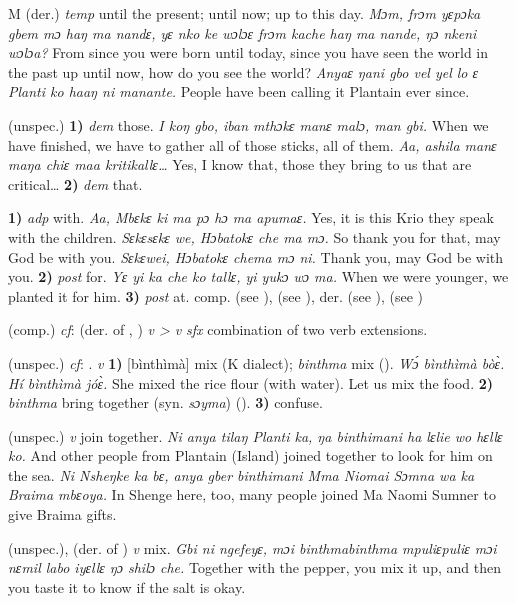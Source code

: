 \begin{letter}{M}
 (der.) \textit{temp} until the present; until now; up to this day. \textit{Mɔm, frɔm yɛpɔka gbem mɔ haŋ ma nandɛ, yɛ nko ke wɔlɔɛ frɔm kache haŋ ma nande, ŋɔ nkeni wɔlɔa?} From since you were born until today, since you have seen the world in the past up until now, how do you see the world? \textit{Anyaɛ ŋani gbo vel yel lo ɛ Planti ko haaŋ ni manante.} People have been calling it Plantain ever since.

 (unspec.) \textbf{1)} \textit{dem} those. \textit{I koŋ gbo, iban mthɔkɛ manɛ malɔ, man gbi.} When we have finished, we have to gather all of those sticks, all of them. \textit{Aa, ashila manɛ maŋa chiɛ maa kritikallɛ…} Yes, I know that, those they bring to us that are critical… \textbf{2)} \textit{dem} that.

 \textbf{1)} \textit{adp} with. \textit{Aa, Mbɛkɛ ki ma pɔ hɔ ma apumaɛ.} Yes, it is this Krio they speak with the children. \textit{Sɛkɛsɛkɛ we, Hɔbatokɛ che ma mɔ.} So thank you for that, may God be with you. \textit{Sɛkɛwei, Hɔbatokɛ chema mɔ ni.} Thank you, may God be with you. \textbf{2)} \textit{post} for. \textit{Yɛ yi ka che ko tallɛ, yi yukɔ wɔ ma.} When we were younger, we planted it for him. \textbf{3)} \textit{post} at. comp.  (see ),  (see ), der.  (see ),  (see ) 

 (comp.) \textit{cf}:  (der. of , ) \textit{v > v} \textit{sfx} combination of two verb extensions.

 (unspec.) \textit{cf}: . \textit{v} \textbf{1)} [bìnthìmà] mix (K dialect); \textit{binthma} mix (\citealt{Sumner1921}). \textit{Wɔ́ bìnthìmà bòɛ̀. Hí bìnthìmà jóɛ̀.} She mixed the rice flour (with water). Let us mix the food. \textbf{2)} \textit{binthma} bring together (syn. \textit{sɔyma}) (\citealt{Pichl1967}). \textbf{3)} confuse.

 (unspec.) \textit{v} join together. \textit{Ni anya tilaŋ Planti ka, ŋa binthimani ha lɛlie wo hɛllɛ ko.} And other people from Plantain (Island) joined together to look for him on the sea. \textit{Ni Nsheŋke ka bɛ, anya gber binthimani Mma Niomai Sɔmna wa ka Braima mbɛoya.} In Shenge here, too, many people joined Ma Naomi Sumner to give Braima gifts. 

 (unspec.), (der. of ) \textit{v} mix. \textit{Gbi ni ngefeyɛ, mɔi binthmabinthma mpuliɛpuliɛ mɔi nɛmil labo iyɛllɛ ŋɔ shilɔ che.} Together with the pepper, you mix it up, and then you taste it to know if the salt is okay.


\end{letter}
